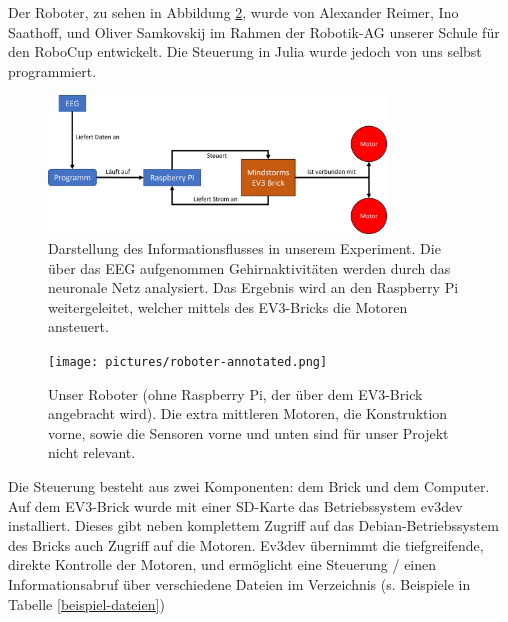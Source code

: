 \documentclass[11pt]{scrartcl}
\begin{document}
	Der Roboter, zu sehen in Abbildung \ref{Robot}, wurde von Alexander Reimer, Ino Saathoff, und Oliver Samkovskij im Rahmen der Robotik-AG unserer Schule für den RoboCup entwickelt. Die Steuerung in Julia wurde jedoch von uns selbst programmiert.

	\begin{figure}[H]
		\centering
		\includegraphics[width=0.8\textwidth]{pictures/roboter-funktionsweise.png}
		\caption{Darstellung des Informationsflusses in unserem Experiment. Die über das EEG aufgenommen Gehirnaktivitäten werden durch das neuronale Netz analysiert. Das Ergebnis wird an den Raspberry Pi weitergeleitet, welcher mittels des EV3-Bricks die Motoren ansteuert.}
		\label{robot-funktion}
	\end{figure}

	\begin{figure}[H]
		\centering
		\texttt{[image: pictures/roboter-annotated.png]}
		\caption{Unser Roboter (ohne Raspberry Pi, der über dem EV3-Brick angebracht wird). Die extra mittleren Motoren, die Konstruktion vorne, sowie die Sensoren vorne und unten sind für unser Projekt nicht relevant.}
		\label{Robot}
	\end{figure}

	Die Steuerung besteht aus zwei Komponenten: dem Brick und dem Computer.
	Auf dem EV3-Brick wurde mit einer SD-Karte das Betriebssystem ev3dev installiert. Dieses gibt neben komplettem Zugriff auf das Debian-Betriebssystem des Bricks auch Zugriff auf die Motoren. Ev3dev übernimmt die tiefgreifende, direkte Kontrolle der Motoren, und ermöglicht eine Steuerung / einen Informationsabruf über verschiedene Dateien im  Verzeichnis (s. Beispiele in Tabelle \ref{beispiel-dateien})
\end{document}

